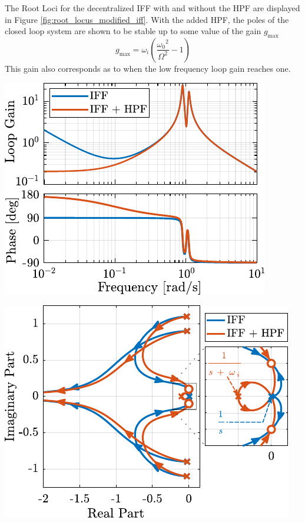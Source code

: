\documentclass{ISMA_USD2020}
\begin{document}
The Root Loci for the decentralized IFF with and without the HPF are displayed in Figure \ref{fig:root_locus_modified_iff}.
With the added HPF, the poles of the closed loop system are shown to be stable up to some value of the gain \(g_\text{max}\)
\begin{equation}
\label{eq:gmax_iff_hpf}
  g_{\text{max}} = \omega_i \left( \frac{{\omega_0}^2}{\Omega^2} - 1 \right)
\end{equation}
This gain also corresponds as to when the low frequency loop gain reaches one.

\begin{minipage}[b]{0.45\linewidth}
\begin{center}
\includegraphics[scale=1]{figs/loop_gain_modified_iff.pdf}
\end{center}
\end{minipage}
\hfill
\begin{minipage}[b]{0.5\linewidth}
\begin{center}
\includegraphics[scale=1]{figs/root_locus_modified_iff.pdf}
\end{center}
\end{minipage}
\end{document}
